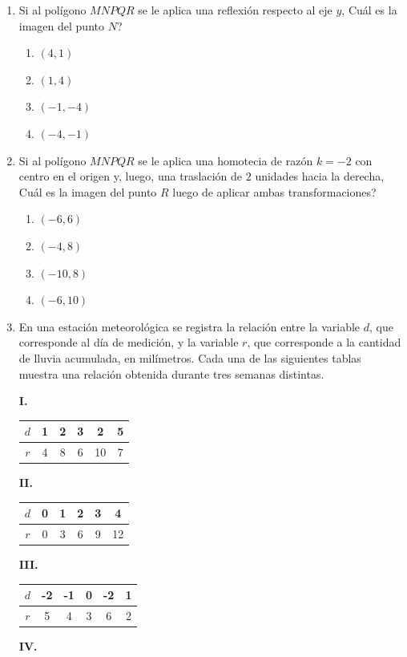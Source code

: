 \documentclass[12pt]{article}
\newcommand{\tablarel}[2]{%
\begin{tabular}{|c|*{5}{c|}}
\hline
#1 \\ \hline
#2 \\ \hline
\end{tabular}}
\begin{document}
\begin{enumerate}[label=\textbf{\arabic*.}, itemsep=2.5cm]
\item
Si al pol\'igono $MNPQR$ se le aplica una reflexi\'on respecto al eje $y$, \textquestiondown Cu\'al es la imagen del punto $N$?

\begin{enumerate}[label=\Alph*)]
  \item $(4, 1)$
  \item $(1, 4)$
  \item $(-1, -4)$
  \item $(-4, -1)$
\end{enumerate}

\item
Si al pol\'igono $MNPQR$ se le aplica una homotecia de raz\'on $k = -2$ con centro en el origen y, luego, una traslaci\'on de $2$ unidades hacia la derecha, \textquestiondown Cu\'al es la imagen del punto $R$ luego de aplicar ambas transformaciones?

\begin{enumerate}[label=\Alph*)]
  \item $(-6, 6)$
  \item $(-4, 8)$
  \item $(-10, 8)$
  \item $(-6, 10)$
\end{enumerate}

\Needspace{0.90\textheight}
\item
En una estaci\'on meteorol\'ogica se registra la relaci\'on entre la variable $d$, que corresponde al d\'ia de medici\'on, y la variable $r$, que corresponde a la cantidad de lluvia acumulada, en mil\'imetros. Cada una de las siguientes tablas muestra una relaci\'on obtenida durante tres semanas distintas.

\textbf{I.}

\begin{center}
\tablarel{$d$ & 1 & 2 & 3 & 2 & 5}{$r$ & 4 & 8 & 6 & 10 & 7}
\end{center}

\textbf{II.}

\begin{center}
\tablarel{$d$ & 0 & 1 & 2 & 3 & 4}{$r$ & 0 & 3 & 6 & 9 & 12}
\end{center}

\textbf{III.}

\begin{center}
\tablarel{$d$ & -2 & -1 & 0 & -2 & 1}{$r$ & 5 & 4 & 3 & 6 & 2}
\end{center}

\textbf{IV.}


\end{enumerate}
\end{document}

